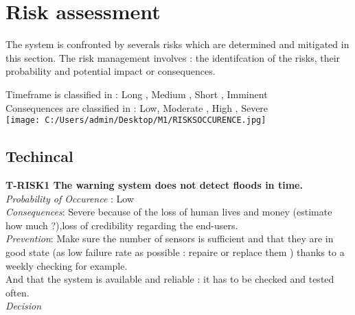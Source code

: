 \section{Risk assessment}
The system is confronted by severals risks which are determined and mitigated in this section.
The risk management involves : the identifcation of the risks, their probability and potential impact or consequences.

Timeframe is classified in : Long , Medium , Short , Imminent \\
Consequences are classified in : Low, Moderate , High , Severe \\

\texttt{[image: C:/Users/admin/Desktop/M1/RISKSOCCURENCE.jpg]} %
\subsection{Techincal}

	\textbf{ T-RISK1 The warning system does not detect floods in time.} \\
	\textit{Probability of Occurence} : Low \\ %
	\textit{Consequences}: Severe because of the loss of human lives and money (estimate how much ?),loss of credibility regarding the end-users.\\
	\textit{Prevention}: Make sure the number of sensors is sufficient and that they are in good state (as low failure rate as possible : repaire or replace them ) thanks to a weekly checking for example. \\
	And that the system is available and reliable : it has to be checked and tested often.\\
	\textit{Decision} \\
	

